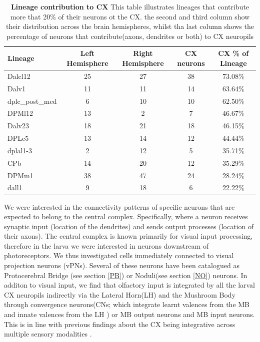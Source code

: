 \begin{table}[h!]
\centering
\begin{tabular}{|l|c|c|c|c|}
\hline
\textbf{Lineage} & \textbf{Left Hemisphere} & \textbf{Right Hemisphere} & \textbf{CX neurons} & \textbf{CX \% of Lineage} \\
\hline
Dalcl12 & 25 & 27 & 38 & \cellcolor{forest5}73.08\% \\
Dalv1 & 11 & 11 & 14 & \cellcolor{forest4}63.64\% \\
dplc\_post\_med & 6 & 10 & 10 & \cellcolor{forest4}62.50\% \\
DPMl12 & 13 & 2 & 7 & \cellcolor{forest3}46.67\% \\
Dalv23 & 18 & 21 & 18 & \cellcolor{forest3}46.15\% \\
DPLc5 & 13 & 14 & 12 & \cellcolor{forest3}44.44\% \\
dplal1-3 & 2 & 12 & 5 & \cellcolor{forest2}35.71\% \\
CPb & 14 & 20 & 12 & \cellcolor{forest2}35.29\% \\
DPMm1 & 38 & 47 & 24 & \cellcolor{forest1}28.24\% \\
dall1 & 9 & 18 & 6 & \cellcolor{forest1}22.22\% \\
\hline
\end{tabular}
\caption[Contribution of lineage to CX]{\textbf{Lineage contribution to CX}  This table illustrates lineages that contribute more that 20\% of their neurons ot the CX. the second and third column show their distribution across the brain hemispheres, whilst tha last column shows the percentage of neurons that contribute(axons, dendrites or both) to CX neuropils}
\label{cx_percentage}
\end{table}


We were interested in the connectivity patterns of specific neurons that are expected to belong to the central complex. Specifically, where a neuron receives synaptic input (location of the dendrites) and sends output processes (location of their axons).
The central complex is known primarily for visual input processing, therefore in the larva we were interested in neurons downstream of photoreceptors. We thus investigated cells immediately connected to visual projection neurons (vPNs). Several of these neurons have been catalogued as Protocerebral Bridge (see section \ref{PB}) or Noduli(see section \ref{NO}) neurons. 
In additon to visual input, we find that olfactory input is integrated by all the larval CX neuropils indirectly via the Lateral Horn(LH) and the Mushroom Body through convergence neurons(CNs; which integrate learnt valences from the MB and innate valences from the LH \citep{eschbach2021circuits}) or MB output neurons and MB input neurons. This is in line with previous findings about the CX being integrative across multiple sensory modalities \citep{hulse2021connectome}. 

